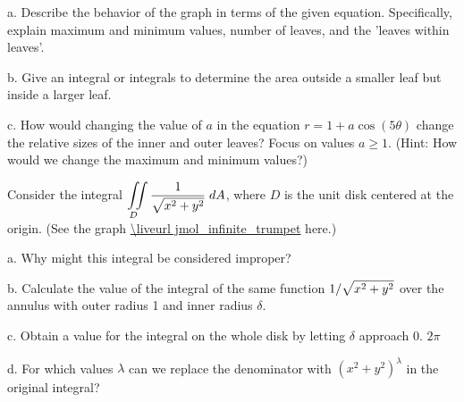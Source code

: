 \beginlist

\item{a.} Describe the behavior of the graph in terms of the given
  equation.  Specifically, explain maximum and minimum values, number
  of leaves, and the 'leaves within leaves'.
 
\item{b.} Give an integral or integrals to determine the area outside a
  smaller leaf but inside a larger leaf.


\item{c.} How would changing the value of $a$ in the equation
  $r=1+a\cos(5\theta)$ change the relative sizes of the inner and
  outer leaves? Focus on values $a\geq 1$.  (Hint: How would we change
  the maximum and minimum values?)
 
\endlist
\endexercise

\exercise Consider the integral $\ds\dint{D} {1\over\sqrt{x^2+y^2}} \;
dA$, where $D$ is the unit disk centered at the origin. 
\texonly
(See the graph
\expandafter\url\expandafter{\liveurl jmol_infinite_trumpet}%
here\endurl.)
\endtexonly
{}
\beginlist

\item{a.} Why might this integral be considered improper?

\item{b.} Calculate the value of the integral of the same function
  $\displaystyle 1/\sqrt{x^2+y^2}$ over the annulus with outer radius 1 and
  inner radius $\delta$.

\item{c.} Obtain a value for the integral on the whole disk by letting
  $\delta$ approach 0.
\answer $2\pi$
\endanswer

\item{d.} For which values $\lambda$ can we replace the denominator with
  $(x^2+y^2)^\lambda$ in the original integral?

\endlist
\endexercise

\endexercises
